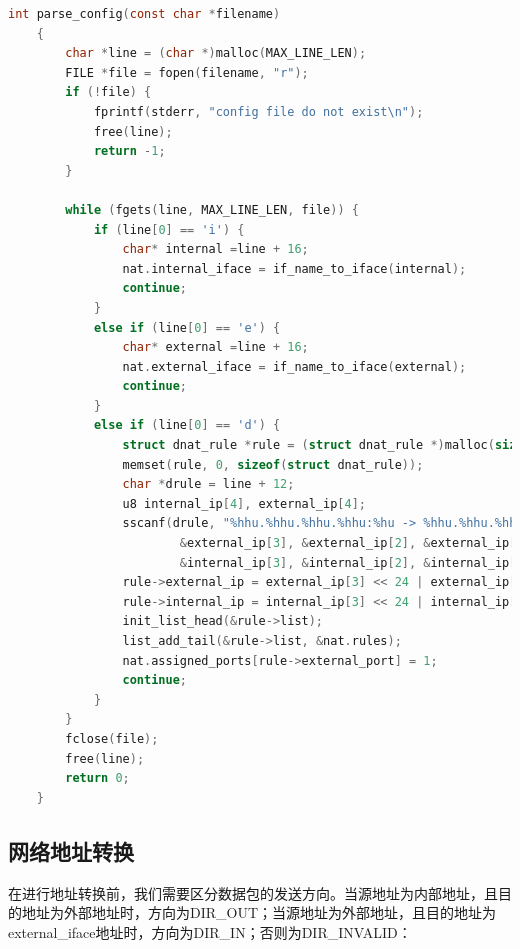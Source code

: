 \documentclass[UTF8]{report}
\begin{document}
\begin{lstlisting}[language=C]
    int parse_config(const char *filename)
    {
        char *line = (char *)malloc(MAX_LINE_LEN);
        FILE *file = fopen(filename, "r");
        if (!file) {
            fprintf(stderr, "config file do not exist\n");
            free(line);
            return -1;
        }
    
        while (fgets(line, MAX_LINE_LEN, file)) {		
            if (line[0] == 'i') {
                char* internal =line + 16;
                nat.internal_iface = if_name_to_iface(internal);
                continue;
            }
            else if (line[0] == 'e') {
                char* external =line + 16;
                nat.external_iface = if_name_to_iface(external);
                continue;
            }
            else if (line[0] == 'd') {
                struct dnat_rule *rule = (struct dnat_rule *)malloc(sizeof(struct dnat_rule));
                memset(rule, 0, sizeof(struct dnat_rule));
                char *drule = line + 12;
                u8 internal_ip[4], external_ip[4];
                sscanf(drule, "%hhu.%hhu.%hhu.%hhu:%hu -> %hhu.%hhu.%hhu.%hhu:%hu", 
                        &external_ip[3], &external_ip[2], &external_ip[1], &external_ip[0], &rule->external_port,
                        &internal_ip[3], &internal_ip[2], &internal_ip[1], &internal_ip[0], &rule->internal_port);
                rule->external_ip = external_ip[3] << 24 | external_ip[2] << 16 | external_ip[1] << 8 | external_ip[0];
                rule->internal_ip = internal_ip[3] << 24 | internal_ip[2] << 16 | internal_ip[1] << 8 | internal_ip[0];
                init_list_head(&rule->list);
                list_add_tail(&rule->list, &nat.rules);
                nat.assigned_ports[rule->external_port] = 1;
                continue;
            }
        }
        fclose(file);
        free(line);
        return 0;
    }
\end{lstlisting}

\subsection{网络地址转换}

在进行地址转换前，我们需要区分数据包的发送方向。当源地址为内部地址，且目的地址为外部地址时，方向为DIR_OUT；当源地址为外部地址，且目的地址为external_iface地址时，方向为DIR_IN；否则为DIR_INVALID：
\end{document}
